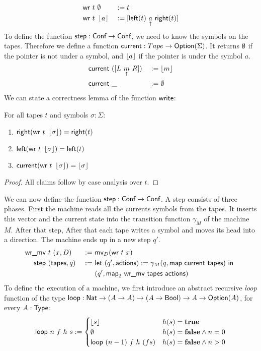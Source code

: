 \documentclass{psartcl}
\begin{document}
\begin{alignat*}{3}
  \textsf{wr}~t &~ \emptyset   &&:= t \\
  \textsf{wr}~t &~ \left\lfloor {a}\right\rfloor &&:= [ \textsf{left}(t)~\underset{\uparrow}{a}~\textsf{right}(t) ]
\end{alignat*}
To define the function $\textsf{step} : \textsf{Conf} \rightarrow \textsf{Conf}$, we need to know the symbols on the tapes.
Therefore we define a function $\textsf{current} : Tape \rightarrow \textsf{Option}(\Sigma)$.
It returns $\emptyset$ if the pointer is not under a symbol, and $\left\lfloor {a}\right\rfloor$ if the pointer is under the symbol $a$.
\begin{alignat*}{2}
  \textsf{current}&~([ L~\underset{\uparrow}{m}~R ])&&:= \left\lfloor {m}\right\rfloor \\
  \textsf{current}&~\_                 &&:= \emptyset
\end{alignat*}
We can state a correctness lemma of the function $\textsf{write}$:
\begin{lemma}[Write]
  \label{lem:write}
  For all tapes $t$ and symbols $\sigma:\Sigma$:
  \begin{enumerate}
    \item $\textsf{right}   (\textsf{wr}~t~\left\lfloor {\sigma}\right\rfloor) = \textsf{right}(t)$
    \item $\textsf{left}    (\textsf{wr}~t~\left\lfloor {\sigma}\right\rfloor) = \textsf{left} (t)$
    \item $\textsf{current} (\textsf{wr}~t~\left\lfloor {\sigma}\right\rfloor) = \left\lfloor {\sigma}\right\rfloor$
  \end{enumerate}
\end{lemma}
\begin{proof}
  All claims follow by case analysis over $t$.
\end{proof}
We can now define the function $\textsf{step} : \textsf{Conf} \rightarrow \textsf{Conf}$.  A step consists of three phases.  First the machine reads all the currents
symbols from the tapes.  It inserts this vector and the current state into the transition function $\gamma_M$ of the machine $M$.  After that step,
After that each tape writes a symbol and moves its head into a direction.  The machine ends up in a new step $q'$.
\begin{alignat*}{2}
  \textsf{wr\_mv}&~t~(x, D)        &~:=~& \textsf{mv}_D (\textsf{wr}~t~x) \\
    \textsf{step}&~(\textsf{tapes}, q) &~:=~& \textsf{let}~(q', \textsf{actions}) := \gamma_M(q, \textsf{map}~\textsf{current}~\textsf{tapes})~\textsf{in}~ \\
             &                 &~  ~& (q', \textsf{map}_2~\textsf{wr\_mv}~\textsf{tapes}~\textsf{actions})
\end{alignat*}
To define the execution of a machine, we first introduce an abstract recursive \emph{loop} function of the type
$\textsf{loop} : \textsf{Nat} \rightarrow (A \rightarrow A) \rightarrow (A \rightarrow \textsf{Bool}) \rightarrow A \rightarrow \textsf{Option}(A)$, for every $A:\textsf{Type}$:
\begin{align*}
  \textsf{loop}~n~f~h~s :=
  \begin{cases}
    \left\lfloor {s}\right\rfloor              & h(s) = \mathbf{true} \\
    \emptyset                 & h(s) = \mathbf{false} \land n = 0 \\
    \textsf{loop}~(n-1)~f~h~(f s)  & h(s) = \mathbf{false} \land n > 0
  \end{cases}
\end{align*}
\end{document}
